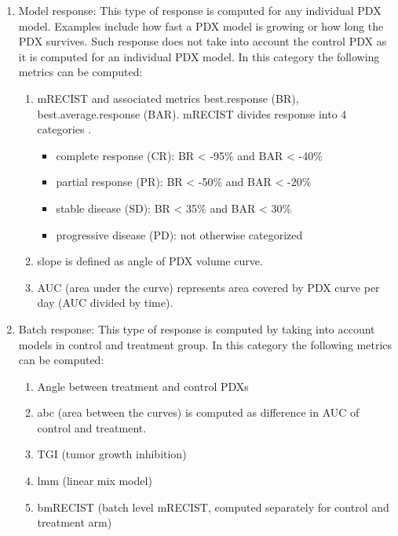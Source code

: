 \documentclass{article}\usepackage[]{graphicx}\usepackage[]{xcolor}
\begin{document}
\begin{enumerate}
	\item Model response: This type of response is computed for any individual PDX model.
	Examples include how fast a PDX model is growing or how long the PDX survives.
	Such response does not take into account the control PDX as it is computed for an individual PDX model.
	In this category the following metrics can be computed:
    \begin{enumerate}
    	\item mRECIST and associated metrics best.response (BR), best.average.response (BAR).
    	mRECIST divides response into 4 categories  \cite{MerXeva}.
      	\begin{itemize}
      	\item complete response (CR): BR < -95\% and BAR < -40\%
      	\item partial response (PR): BR < -50\% and BAR < -20\%
      	\item stable disease (SD): BR < 35\% and BAR < 30\%
      	\item progressive disease (PD): not otherwise categorized
      	\end{itemize}

      \item slope is defined as angle of PDX volume curve.
      \item AUC (area under the curve) represents area covered by PDX curve per day (AUC divided by time).
    \end{enumerate}

    \item Batch response: This type of response is computed by taking into account models in control and treatment group. In this category the following metrics can be computed:
    \begin{enumerate}
    \item Angle between treatment and control PDXs
    \item abc (area between the curves) is computed as difference in AUC of control and treatment.
    \item TGI (tumor growth inhibition)
    \item lmm (linear mix model)
    \item bmRECIST (batch level mRECIST, computed separately for control and treatment arm)
    \end{enumerate}
\end{enumerate}
\end{document}
